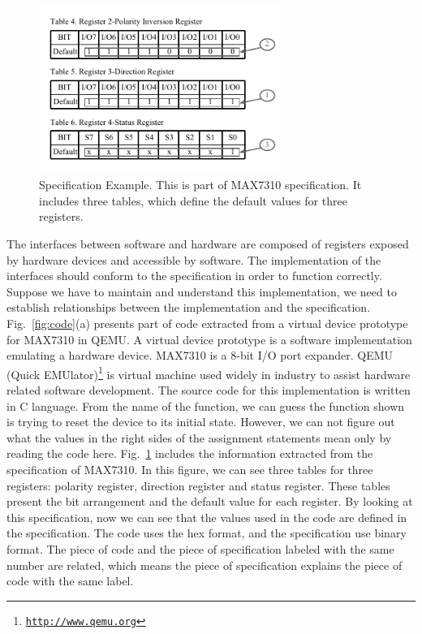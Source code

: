 \begin{figure}
  \centering
  \includegraphics[width=0.7\textwidth]{spec}
  \caption{Specification Example. This is part of MAX7310 specification. It includes three tables, which define the default values for three registers.}
  \label{fig:spec}
\end{figure}

The interfaces between software and hardware are composed of registers exposed by hardware devices and accessible by software. The implementation of the interfaces should conform to the specification in order to function correctly. Suppose we have to maintain and understand this implementation, we need to establish relationships between the implementation and the specification. Fig.~\ref{fig:code}(a) presents part of code extracted from a virtual device prototype for MAX7310 in QEMU. A virtual device prototype is a software implementation emulating a hardware device. MAX7310 is a 8-bit I/O port expander. QEMU (Quick EMUlator)\footnote{\texttt{\url{http://www.qemu.org}}} is virtual machine used widely in industry to assist hardware related software development. The source code for this implementation is written in C language. From the name of the function, we can guess the function shown is trying to reset the device to its initial state. However, we can not figure out what the values in the right sides of the assignment statements mean only by reading the code here. Fig.~\ref{fig:spec} includes the information extracted from the specification of MAX7310. In this figure, we can see three tables for three registers: polarity register, direction register and status register. These tables present the bit arrangement and the default value for each register. By looking at this specification, now we can see that the values used in the code are defined in the specification. The code uses the hex format, and the specification use binary format. The piece of code and the piece of specification labeled with the same number are related, which means the piece of specification explains the piece of code with the same label.

